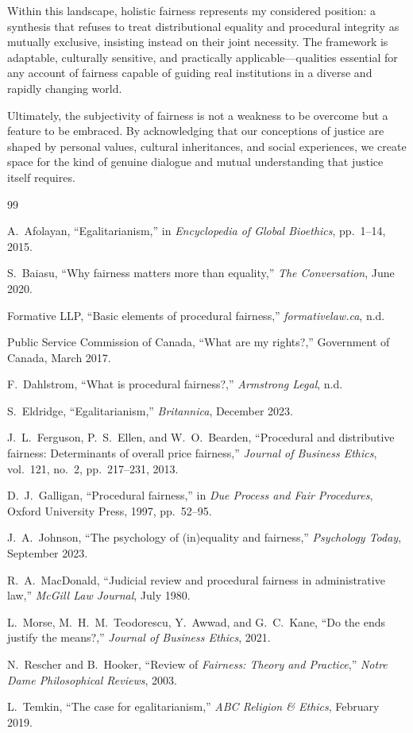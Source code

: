 \documentclass[11pt,showkeys]{../../shared/essay}
\begin{document}
Within this landscape, holistic fairness represents my considered position: a synthesis that
refuses to treat distributional equality and procedural integrity as mutually exclusive, insisting
instead on their joint necessity. The framework is adaptable, culturally sensitive, and
practically applicable---qualities essential for any account of fairness capable of guiding real
institutions in a diverse and rapidly changing world.

Ultimately, the subjectivity of fairness is not a weakness to be overcome but a feature to be
embraced. By acknowledging that our conceptions of justice are shaped by personal values,
cultural inheritances, and social experiences, we create space for the kind of genuine dialogue
and mutual understanding that justice itself requires.

\begin{thebibliography}{99}

A.~Afolayan,
``Egalitarianism,''
in \textit{Encyclopedia of Global Bioethics}, pp.~1--14, 2015.

S.~Baiasu,
``Why fairness matters more than equality,''
\textit{The Conversation}, June 2020.

Formative LLP,
``Basic elements of procedural fairness,''
\textit{formativelaw.ca}, n.d.

Public Service Commission of Canada,
``What are my rights?,''
Government of Canada, March 2017.

F.~Dahlstrom,
``What is procedural fairness?,''
\textit{Armstrong Legal}, n.d.

S.~Eldridge,
``Egalitarianism,''
\textit{Britannica}, December 2023.

J.~L.~Ferguson, P.~S.~Ellen, and W.~O.~Bearden,
``Procedural and distributive fairness: Determinants of overall price fairness,''
\textit{Journal of Business Ethics}, vol.~121, no.~2, pp.~217--231, 2013.

D.~J.~Galligan,
``Procedural fairness,''
in \textit{Due Process and Fair Procedures},
Oxford University Press, 1997, pp.~52--95.

J.~A.~Johnson,
``The psychology of (in)equality and fairness,''
\textit{Psychology Today}, September 2023.

R.~A.~MacDonald,
``Judicial review and procedural fairness in administrative law,''
\textit{McGill Law Journal}, July 1980.

L.~Morse, M.~H.~M.~Teodorescu, Y.~Awwad, and G.~C.~Kane,
``Do the ends justify the means?,''
\textit{Journal of Business Ethics}, 2021.

N.~Rescher and B.~Hooker,
``Review of \textit{Fairness: Theory and Practice},''
\textit{Notre Dame Philosophical Reviews}, 2003.

L.~Temkin,
``The case for egalitarianism,''
\textit{ABC Religion \& Ethics}, February 2019.

\end{thebibliography}
\end{document}
